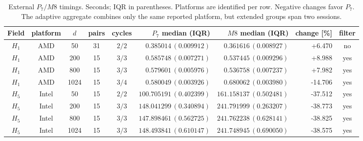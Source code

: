 \begin{table}[htbp]
\centering\scriptsize
\setlength{\tabcolsep}{3pt}
\caption{External $P_7/M8$ timings. Seconds; IQR in parentheses. Platforms are identified per row. Negative changes favor $P_7$. The adaptive aggregate combines only the same reported platform, but extended groups span two sessions.}\label{tab:ext-external8}
\begin{tabular}{cccccrrrc}\toprule
Field & platform & $d$ & pairs & cycles & $P_7$ median (IQR) & $M8$ median (IQR) & change [\%] & filter\\\midrule
$H_1$ & AMD & 50 & 31 & $2/2$ & $0.385014\,(0.009912)$ & $0.361616\,(0.008927)$ & +6.470 & no\\
$H_1$ & AMD & 200 & 15 & $3/3$ & $0.585748\,(0.007271)$ & $0.537445\,(0.009296)$ & +8.988 & yes\\
$H_1$ & AMD & 800 & 15 & $3/3$ & $0.579601\,(0.005976)$ & $0.536758\,(0.007237)$ & +7.982 & yes\\
$H_1$ & AMD & 1024 & 15 & $3/4$ & $0.580049\,(0.003926)$ & $0.680062\,(0.003980)$ & -14.706 & yes\\
$H_5$ & Intel & 50 & 15 & $2/2$ & $100.705191\,(0.402399)$ & $161.158137\,(0.502481)$ & -37.512 & yes\\
$H_5$ & Intel & 200 & 15 & $3/3$ & $148.041299\,(0.340894)$ & $241.791999\,(0.263207)$ & -38.773 & yes\\
$H_5$ & Intel & 800 & 15 & $3/3$ & $147.898461\,(0.562725)$ & $241.762238\,(0.628141)$ & -38.825 & yes\\
$H_5$ & Intel & 1024 & 15 & $3/3$ & $148.493841\,(0.610147)$ & $241.748945\,(0.690050)$ & -38.575 & yes\\
\bottomrule\end{tabular}
\end{table}
\FloatBarrier
